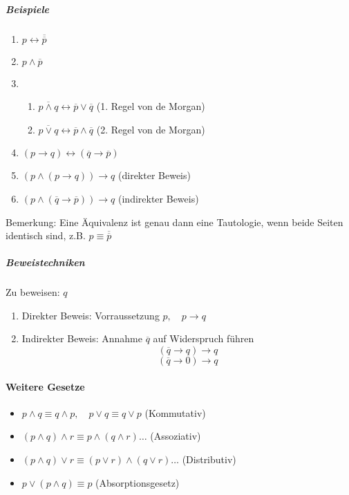\documentclass[a4paper]{scrartcl}
\begin{document}
\subparagraph{Beispiele}
\begin{enumerate}
\item $p \leftrightarrow \overline{\overline{p}}$
\item $p\wedge \overline{p}$
\item
\begin{enumerate}

\item $\overline{p \wedge q} \leftrightarrow \overline{p}\vee \overline{q}$ (1. Regel von de Morgan)
\item $\overline{p\vee q} \leftrightarrow \overline{p} \wedge \overline{q}$ (2. Regel von de Morgan)
\end{enumerate}
\item $(p \rightarrow q) \leftrightarrow (\overline{q} \rightarrow \overline{p})$
\item $(p \wedge (p \rightarrow q)) \rightarrow q$ (direkter Beweis)
\item $(p \wedge (\overline{q} \rightarrow \overline{p}))\rightarrow q$ (indirekter Beweis)
\end{enumerate}

Bemerkung: Eine Äquivalenz ist genau dann eine Tautologie, wenn beide Seiten identisch sind, z.B. $p \equiv \overline{\overline{p}}$

\subparagraph{Beweistechniken} Zu beweisen: $q$
\begin{enumerate}
\item Direkter Beweis: Vorraussetzung $p, \quad p \rightarrow q$
\item Indirekter Beweis: Annahme $\overline{q}$ auf Widerspruch führen\\
\begin{equation*}
(\overline{q} \rightarrow q) \rightarrow q
\end{equation*}
\begin{equation*}
(\overline{q} \rightarrow 0 ) \rightarrow q
\end{equation*}
\end{enumerate}

\paragraph{Weitere Gesetze}
\begin{itemize}
\item $p \wedge q \equiv q \wedge p, \quad p \vee q \equiv q \vee p$ (Kommutativ)
\item $(p\wedge q) \wedge r \equiv p \wedge (q \wedge r ) \dots$ (Assoziativ)
\item $(p\wedge q)\vee r \equiv (p \vee r) \wedge (q \vee r) \dots$ (Distributiv)
\item $p \vee (p \wedge q) \equiv p$ (Absorptionsgesetz)
\end{itemize}
\end{document}
